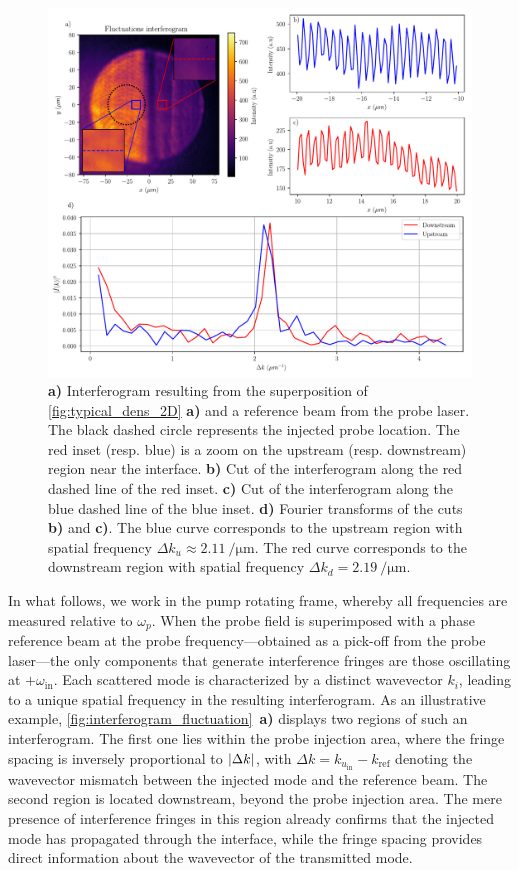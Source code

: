 \begin{figure}
    \centering
    \includegraphics[width=1\textwidth]{chap_stimulated_hawking/fig/interferogram_fluctuations.pdf}
    \caption{\textbf{a)} Interferogram resulting from the superposition of \autoref{fig:typical_dens_2D} \textbf{a)} and a reference beam from the probe laser. The black dashed circle
    represents the injected probe location. The red inset (resp. blue) is a zoom on the upstream (resp. downstream) region near the interface. 
    \textbf{b)} Cut of the interferogram along the red dashed line of the red inset. 
    \textbf{c)} Cut of the interferogram along the blue dashed line of the blue inset. 
    \textbf{d)} Fourier transforms of the cuts \textbf{b)} and \textbf{c)}. The blue curve corresponds to the upstream region with spatial frequency $\Delta k_u\approx\SI{2.11}{\per \micro \meter}$. The red curve corresponds to the downstream region with spatial frequency $\Delta k_d= \SI{2.19}{\per \micro \meter}$. 
     }
    \label{fig:interferogram_fluctuation}
\end{figure}
In what follows, we work in the pump rotating frame, whereby all frequencies are measured relative to $\omega_p$.
When the probe field is superimposed with a phase reference beam at the probe frequency—obtained as a pick-off from the probe laser—the only components that generate interference fringes are those oscillating at \(+\omega_{\text{in}}\). 
Each scattered mode is characterized by a distinct wavevector \(k_i\), leading to a unique spatial frequency in the resulting interferogram.
As an illustrative example, \autoref{fig:interferogram_fluctuation}~\textbf{a)} displays two regions of such an interferogram.
 The first one lies within the probe injection area, where the fringe spacing is inversely proportional to \(\abs{\Delta k}\), with \(\Delta k = k_{u_{\text{in}}} - k_{\text{ref}}\) denoting the wavevector mismatch between the injected mode and the reference beam. 
 The second region is located downstream, beyond the probe injection area. The mere presence of interference fringes in this region already confirms that the injected mode has propagated through the interface, while the fringe spacing provides direct information about the wavevector of the transmitted mode.

